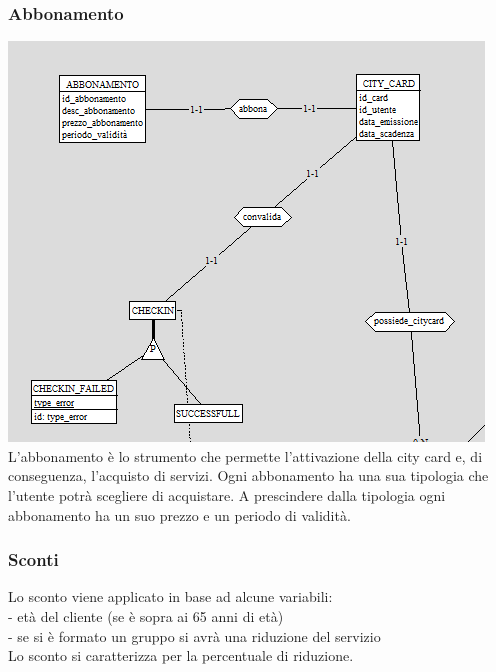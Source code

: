 \subsubsection{Abbonamento}
\includegraphics[width=0.95\columnwidth]{images/abbonamento.png}\\
L'abbonamento è lo strumento che permette l'attivazione della city card e, di conseguenza, l'acquisto di servizi. Ogni abbonamento ha una sua tipologia che l'utente potrà scegliere di acquistare. A prescindere dalla tipologia ogni abbonamento ha un suo prezzo e un periodo di validità.
\subsubsection{Sconti}
Lo sconto viene applicato in base ad alcune variabili: \\
    - età del cliente (se è sopra ai 65 anni di età) \\
    - se si è formato un gruppo si avrà una riduzione del servizio \\
Lo sconto si caratterizza per la percentuale di riduzione.